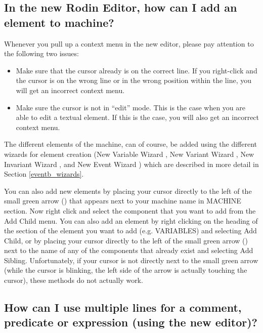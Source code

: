 \subsection{In the new Rodin Editor, how can I add an element to machine?}
\label{faq_new_editor_new_element}



Whenever you pull up a context menu in the new editor, please pay attention to the following two issues:
\begin{itemize}
	\item Make sure that the cursor already is on the correct line.  If you right-click and the cursor is on the wrong line or in the wrong position within the line, you will get an incorrect context menu.
	\item Make sure the cursor is not in ``edit'' mode. This is the case when you are able to edit a textual element.  If this is the case, you will also get an incorrect context menu.
\end{itemize}

The different elements of the machine, can of course, be added using the different wizards for element creation (New Variable Wizard , New Variant Wizard , New Invariant Wizard , and New Event Wizard ) which are described in more detail in Section \ref{eventb_wizards}. 

You can also add new elements by placing your cursor directly to the left of the small green arrow () that appears next to your machine name in \textsf{MACHINE} section. Now right click and select the component that you want to add from the \textsf{Add Child} menu. You can also add an element by right clicking on the heading of the section of the element you want to add (e.g. \textsf{VARIABLES}) and selecting \textsf{Add Child}, or by placing your cursor directly to the left of the small green arrow () next to the name of any of the components that already exist and selecting \textsf{Add Sibling}. Unfortunately, if your cursor is not directly next to the small green arrow (while the cursor is blinking, the left side of the arrow is actually touching the cursor), these methods do not actually work. 

\subsection{How can I use multiple lines for a comment, predicate or expression (using the new editor)?}

